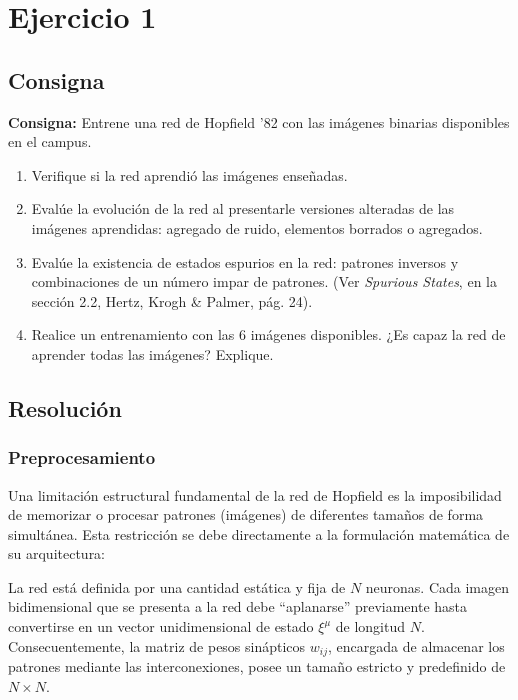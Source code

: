 \section{Ejercicio 1}

\subsection{Consigna}

\textbf{Consigna:} Entrene una red de Hopfield '82 con las imágenes binarias disponibles en el campus.

\begin{enumerate}
	\item[\textbf{a)}] Verifique si la red aprendió las imágenes enseñadas.
	
	\item[\textbf{b)}] Evalúe la evolución de la red al presentarle versiones alteradas de las imágenes aprendidas: agregado de ruido, elementos borrados o agregados.
	
	\item[\textbf{c)}] Evalúe la existencia de estados espurios en la red: patrones inversos y combinaciones de un número impar de patrones. (Ver \textit{Spurious States}, en la sección 2.2, Hertz, Krogh \& Palmer, pág. 24).
	
	\item[\textbf{d)}] Realice un entrenamiento con las 6 imágenes disponibles. ¿Es capaz la red de aprender todas las imágenes? Explique.
\end{enumerate}

\subsection{Resolución}

\subsubsection{Preprocesamiento}

Una limitación estructural fundamental de la red de Hopfield es la imposibilidad de memorizar o procesar patrones (imágenes) de diferentes tamaños de forma simultánea. Esta restricción se debe directamente a la formulación matemática de su arquitectura:

La red está definida por una cantidad estática y fija de $N$ neuronas. Cada imagen bidimensional que se presenta a la red debe ``aplanarse'' previamente hasta convertirse en un vector unidimensional de estado $\xi^\mu$ de longitud $N$. Consecuentemente, la matriz de pesos sinápticos $w_{ij}$, encargada de almacenar los patrones mediante las interconexiones, posee un tamaño estricto y predefinido de $N \times N$.

